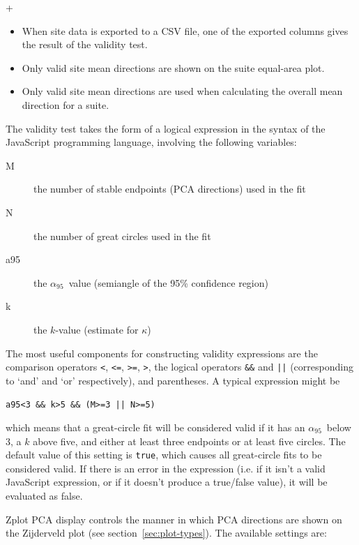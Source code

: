 \documentclass[a4paper,british]{article}
\newcommand{\menuitemlabel}[1]{%
\mbox{\textsf{#1}}\hfil}
\newenvironment{menuitemlist}%
{\begin{list}{}{%
\renewcommand{\makelabel}{\menuitemlabel}%
\setlength{\labelwidth}{35pt}%
\setlength{\leftmargin}%
             {\labelwidth+\labelsep}}}%
{\end{list}}
\newcommand{\caps}[1]{\MakeTextUppercase{#1}} %
\newcommand{\alnifi}{$\alpha_{95}$}
\begin{document}
\begin{menuitemlist}
\begin{itemize}
    \item When site data is exported to a CSV file, one of the exported
      columns gives the result of the validity test.

    \item Only valid site mean directions are shown on the suite equal-area
      plot.

    \item Only valid site mean directions are used when calculating the
      overall mean direction for a suite.

  \end{itemize}

  The validity test takes the form of a logical expression in the syntax of
  the JavaScript programming language, involving the following variables:

\begin{description}
  \item[M] the number of stable endpoints (\caps{pca} directions) used in the fit
  \item[N] the number of great circles used in the fit
  \item[a95] the \alnifi\ value (semiangle of the 95\% confidence region)
  \item[k] the $k$-value (estimate for $\kappa$)
\end{description}

The most useful components for constructing validity expressions are the
comparison operators \texttt{<}, \texttt{<=}, \texttt{>=}, \texttt{>},
the logical operators \texttt{\&\&} and \texttt{||} (corresponding to
`and' and `or' respectively), and parentheses. A typical expression
might be

\centerline{\texttt{a95<3 \&\& k>5 \&\& (M>=3 || N>=5)}}

which means that a great-circle fit will be considered valid if it has an
\alnifi\ below 3, a $k$ above five, and either at least three endpoints or
at least five circles. The default value of this setting is \texttt{true},
which causes all great-circle fits to be considered valid. If there is
an error in the expression (i.e. if it isn't a valid JavaScript expression,
or if it doesn't produce a true/false value), it will be evaluated as
false.

\item[Zplot \caps{pca} display] controls the manner in which \caps{pca}
  directions are shown on the Zijderveld plot (see
  section~\ref{sec:plot-types}). The available settings are:


\end{menuitemlist}
\end{document}
